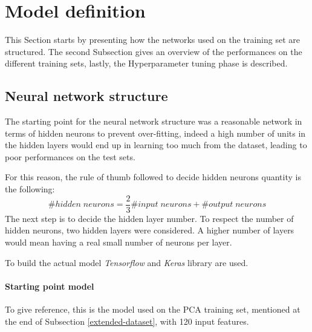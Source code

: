 \section{Model definition}
\label{model-definition}
This Section starts by presenting how the networks used on the training set are 
structured. The second Subsection gives an overview of the performances 
on the different training sets, lastly, the Hyperparameter tuning phase
is described.

\subsection{Neural network structure}
The starting point for the neural network structure was a 
reasonable network in terms of hidden neurons to prevent over-fitting, 
indeed a high number of units in the hidden layers would end up in learning 
too much from the dataset, leading to poor performances on the test sets.

For this reason, the rule of thumb followed to decide hidden neurons quantity is the 
following: 
$$\#\mathit{hidden\; neurons} = \frac{2}{3}\#\mathit{input\;neurons}
+ \#\mathit{output\;neurons}$$
The next step is to decide the hidden layer number. To respect the 
number of hidden neurons, two hidden layers were considered. 
A higher number of layers would mean having a real small number of neurons per layer.

To build the actual model \emph{Tensorflow} and \emph{Keras} library 
are used.~\cite{tensorflow}~\cite{keras}

\paragraph{Starting point model}
To give reference, this is the model used on the PCA training set, mentioned at 
the end of Subsection \vref{extended-dataset}, with 
120 input features.

